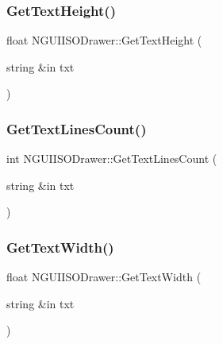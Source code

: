 \hypertarget{class_n_g_u_i_i_s_o_drawer_abb75cabe9bbaccb740d1c63b257e831b}{}\label{class_n_g_u_i_i_s_o_drawer_abb75cabe9bbaccb740d1c63b257e831b} 
\subsubsection{\texorpdfstring{Get\+Text\+Height()}{GetTextHeight()}}
{\footnotesize\ttfamily float N\+G\+U\+I\+I\+S\+O\+Drawer\+::\+Get\+Text\+Height (\begin{DoxyParamCaption}\item[{string \&in}]{txt }\end{DoxyParamCaption})}

\hypertarget{class_n_g_u_i_i_s_o_drawer_a14e2e72e57158ec1d6552177ba7cb7af}{}\label{class_n_g_u_i_i_s_o_drawer_a14e2e72e57158ec1d6552177ba7cb7af} 
\subsubsection{\texorpdfstring{Get\+Text\+Lines\+Count()}{GetTextLinesCount()}}
{\footnotesize\ttfamily int N\+G\+U\+I\+I\+S\+O\+Drawer\+::\+Get\+Text\+Lines\+Count (\begin{DoxyParamCaption}\item[{string \&in}]{txt }\end{DoxyParamCaption})}

\hypertarget{class_n_g_u_i_i_s_o_drawer_afacb32925fa9d2d2ad4c8516f5becd04}{}\label{class_n_g_u_i_i_s_o_drawer_afacb32925fa9d2d2ad4c8516f5becd04} 
\subsubsection{\texorpdfstring{Get\+Text\+Width()}{GetTextWidth()}}
{\footnotesize\ttfamily float N\+G\+U\+I\+I\+S\+O\+Drawer\+::\+Get\+Text\+Width (\begin{DoxyParamCaption}\item[{string \&in}]{txt }\end{DoxyParamCaption})}


